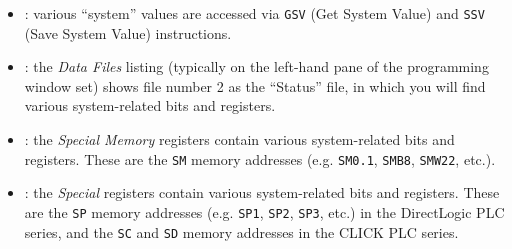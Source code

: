 \begin{itemize}
\item{} : various ``system'' values are accessed via {\tt GSV} (Get System Value) and {\tt SSV} (Save System Value) instructions.
\vskip 5pt
\item{} : the {\it Data Files} listing (typically on the left-hand pane of the programming window set) shows file number 2 as the ``Status'' file, in which you will find various system-related bits and registers.
\vskip 5pt
\item{} : the {\it Special Memory} registers contain various system-related bits and registers.  These are the {\tt SM} memory addresses (e.g. {\tt SM0.1}, {\tt SMB8}, {\tt SMW22}, etc.).
\vskip 5pt
\item{} : the {\it Special} registers contain various system-related bits and registers.  These are the {\tt SP} memory addresses (e.g. {\tt SP1}, {\tt SP2}, {\tt SP3}, etc.) in the DirectLogic PLC series, and the {\tt SC} and {\tt SD} memory addresses in the CLICK PLC series. 
\end{itemize}

\eject
















